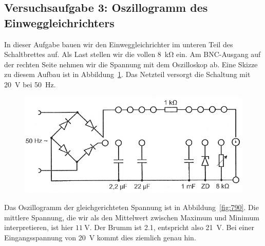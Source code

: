 \FloatBarrier
\subsection{Versuchsaufgabe 3: Oszillogramm des Einweggleichrichters}

In dieser Aufgabe bauen wir den Einweggleichrichter im unteren Teil des
Schaltbrettes auf. Als Last stellen wir die vollen \SI{8}{\kilo\ohm} ein. Am
BNC-Ausgang auf der rechten Seite nehmen wir die Spannung mit dem Oszilloskop
ab. Eine Skizze zu diesem Aufbau ist in Abbildung~\ref{fig:2-10}. Das Netzteil
versorgt die Schaltung mit \SI{20}{\volt} bei \SI{50}{\hertz}.

\begin{figure}[htbp]
	\centering
	\includegraphics[width=.8\textwidth]{Bilder_aus_Anleitung/2-10.png}
	\caption{%
		\cite[Abbildung~2.10]{physik313-Anleitung}
	}
	\label{fig:2-10}
\end{figure}

Das Oszillogramm der gleichgerichteten Spannung ist in
Abbildung~\ref{fig:790}. Die mittlere Spannung, die wir als den Mittelwert
zwischen Maximum und Minimum interpretieren, ist hier $\SI{11}\volt$. Der
Brumm ist \SI{2.1}{\division}, entspricht also \SI{21}{\volt}. Bei einer
Eingangsspannung von \SI{20}{\volt} kommt dies ziemlich genau hin.

